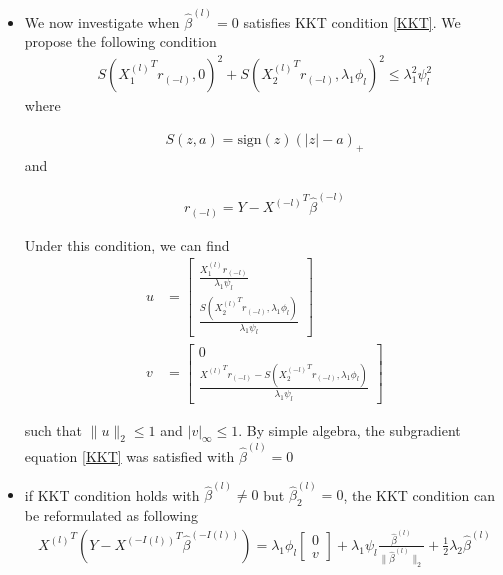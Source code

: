 \documentclass[12pt]{article}
\begin{document}
\begin{itemize}
\item We now investigate when $\hat{\beta}^{(l)}=0$ satisfies KKT condition \ref{KKT}. We propose the following condition
\begin{equation} \label{zero}
  \begin{split}
S(  {X_1^{(l)}}^T  r_{(-l)},0)^2+S(  {X_2^{(l)} }^T  r_{(-l)},\lambda_1\phi_l)^2\leq \lambda_1^2\psi_l^2
\end{split}
\end{equation}
where 

\begin{align}
S(z,a)=\text{sign}(z)(|z|-a)_+
\end{align}
and 

\begin{align}
r_{(-l)}=Y- {X^{(-l)}}^T  \hat{\beta}^{(-l)}
\end{align}

Under this condition, we can find 
\begin{align}
  u & = \begin{bmatrix}
    \frac{X_1^{(l)}r_{(-l)}}{\lambda_1\psi_l} \\
    \frac{S(  {X_2^{(l)} }^T r_{(-l)},\lambda_1\phi_l)}{\lambda_1\psi_l}
  \end{bmatrix}
  \\
  v & = \begin{bmatrix}
    0 \\
    \frac{  {X^{(l)}}^T  r_{(-l)}-S( {X_2^{(-l)}}^T r_{(-l)},\lambda_1\phi_l)}{\lambda_1\psi_l}
  \end{bmatrix}
\end{align}

such that $\parallel u\parallel_2\leq 1$ and $|v|_{\infty}\leq 1$. By simple algebra, the subgradient equation \ref{KKT}
was satisfied with $\hat{\beta}^{(l)}=0$

\item if KKT condition holds with $\hat{\beta}^{(l)}\neq 0$ but $\hat{\beta}_2^{(l)} = 0 $, the KKT condition can be reformulated as following 
\begin{align}
  {X^{(l)}}^T(Y- {X^{(-I(l))}}^T \hat{\beta}^{(-I(l))})=\lambda_1\phi_l \begin{bmatrix}
    0 \\
    v 
  \end{bmatrix}
  + \lambda_1\psi_l \frac{\hat{\beta}^{(l)}}{\parallel \hat{\beta}^{(l)} \parallel_2 } +\frac{1}{2}\lambda_2\hat{\beta}^{(l)}
\end{align}


\end{itemize}
\end{document}
